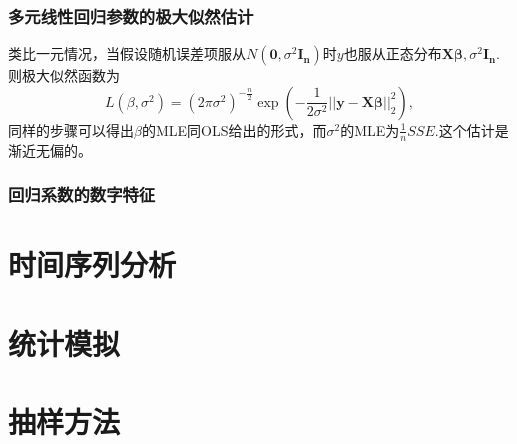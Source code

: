 \documentclass[lang=cn,10pt]{elegantbook}
\begin{document}
    \subsection{多元线性回归参数的极大似然估计}
    类比一元情况，当假设随机误差项服从\(N(\mathbf{0},\sigma^2\mathbf{I_n})\)时\(y\)也服从正态分布\(\mathbf{X\beta},\sigma^2\mathbf{I_n}\).则极大似然函数为
    \[L(\beta,\sigma^2)=(2\pi\sigma^2)^{-\frac{n}{2}}\exp{(-\frac{1}{2\sigma^2}||\mathbf{y-X\beta}||_2^2)},\]
    同样的步骤可以得出\(\beta\)的MLE同OLS给出的形式，而\(\sigma^2\)的MLE为\(\frac{1}{n}SSE\).这个估计是渐近无偏的。
    \subsection{回归系数的数字特征}
    


    \chapter{时间序列分析}

    \chapter{统计模拟}

    \chapter{抽样方法}
\end{document}
